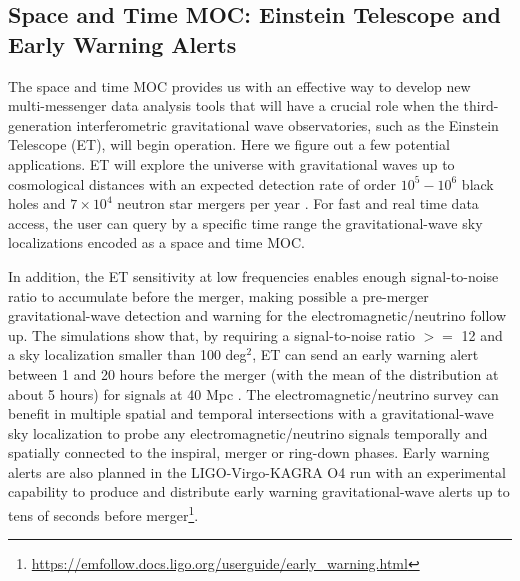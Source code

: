 \documentclass[11pt,a4paper]{ivoa}
\begin{document}
\subsection{Space and Time MOC: Einstein Telescope and Early Warning Alerts}
The space and time MOC provides us with an effective way to develop new
multi-messenger data analysis tools that will have a crucial role when
the third-generation interferometric gravitational wave observatories,
such as the Einstein Telescope (ET), will begin operation. Here we
figure out a few potential applications. ET will explore the universe
with gravitational waves up to cosmological distances with an
expected detection rate of order $10^{5} - 10^{6}$ black holes and $7\times10^4$
neutron star mergers per year \citep{2020JCAP...03..050M}.
For fast and real time data access, the user can query by a specific
time range the gravitational-wave sky localizations encoded as a space
and time MOC.

In addition, the ET sensitivity at low frequencies enables enough
signal-to-noise ratio to accumulate before the merger, making possible
a pre-merger gravitational-wave detection and warning for the
electromagnetic/neutrino follow up.  The simulations show that, by
requiring a signal-to-noise ratio $>=$ 12 and a sky localization smaller
than 100 deg$^2$, ET can send an early warning alert between 1 and 20 hours
before the merger (with the mean of the distribution at about 5 hours)
for signals at 40 Mpc \citep{2018PhRvD..97l3014C}. The
electromagnetic/neutrino survey can benefit
in multiple spatial and temporal intersections with a gravitational-wave
sky localization to probe any electromagnetic/neutrino signals temporally
and spatially connected to the inspiral, merger or ring-down phases.
Early warning alerts are also planned in the LIGO-Virgo-KAGRA O4 run with
an experimental capability to produce and distribute early warning
gravitational-wave alerts up to tens of seconds before
merger\footnote{\url{https://emfollow.docs.ligo.org/userguide/early_warning.html}}.
\end{document}

